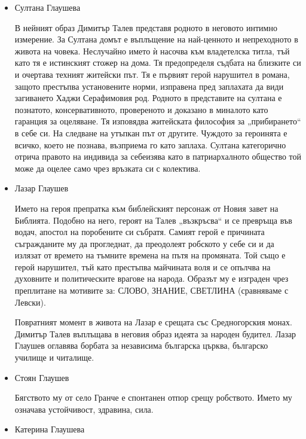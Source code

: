 \documentclass[12pt,a4paper]{article}
\begin{document}
\begin{itemize}
    \item Султана Глаушева
     
    \hspace*{0.5cm} В нейният образ Димитър Талев представя родното в неговото интимно измерение. За Султана домът е въплъщение на най-ценното и непреходното в живота на човека. Неслучайно името ѝ насочва към владетелска титла, тъй като тя е истинският стожер на дома. Тя предопределя съдбата на близките си и очертава техният житейски път. Тя е първият герой нарушител в романа, защото престъпва установените норми, изправена пред заплахата да види загиването Хаджи Серафимовия род. Родното в представите на султана е познатото, консервативното, провереното и доказано в миналото като гаранция за оцеляване. Тя изповядва житейската философия за „прибирането“ в себе си. На следване на утъпкан път от другите. Чуждото за героинята е всичко, което не познава, възприема го като заплаха. Султана категорично отрича правото на индивида за себеизява като в патриархалното общество той може да оцелее само чрез връзката си с колектива.
    \vspace{-0.2cm}
    \item Лазар Глаушев
     
   \hspace*{0.5cm} Името на героя препратка към библейският персонаж от Новия завет на Библията. Подобно на него, героят на Талев „възкръсва“ и се превръща във водач, апостол на поробените си събратя. Самият герой е причината съгражданите му да прогледнат, да преодолеят робското у себе си и да излязат от времето на тъмните времена на пътя на промяната. Той също е герой нарушител, тъй като престъпва майчината воля и се опълчва на духовните и политическите врагове на народа. Образът му е изграден чрез преплитане на мотивите за: СЛОВО, ЗНАНИЕ, СВЕТЛИНА (сравняваме с Левски). 
     
    \hspace*{0.5cm} Повратният момент в живота на Лазар е срещата със Средногорския монах. Димитър Талев въплъщава в неговия образ идеята за народен будител. Лазар Глаушев оглавява борбата за независима българска църква, българско училище и читалище.
    \vspace{-0.2cm}
    \item Стоян Глаушев
     
   \hspace*{0.5cm} Бягството му от село Гранче е спонтанен отпор срещу робството. Името му означава устойчивост, здравина, сила.
   \vspace{-0.2cm}
    \item Катерина Глаушева
     

\end{itemize}
\end{document}
